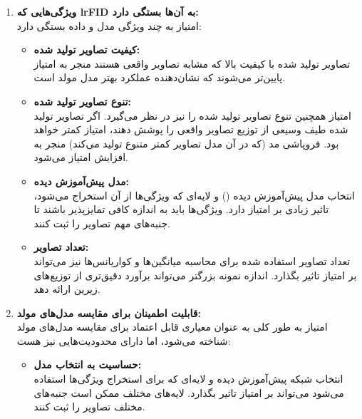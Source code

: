 \begin{enumerate}
\begin{qsolve}
	\begin{enumerate}
		\item \textbf{ویژگی‌هایی که lr{FID} به آن‌ها بستگی دارد: }\\
امتیاز  به چند ویژگی مدل و داده بستگی دارد:

		\begin{itemize}
			\item \textbf{کیفیت تصاویر تولید شده:}\\
تصاویر تولید شده با کیفیت بالا که مشابه تصاویر واقعی هستند منجر به امتیاز  پایین‌تر می‌شوند که نشان‌دهنده عملکرد بهتر مدل مولد است.

		
			\item \textbf{تنوع تصاویر تولید شده:}\\
امتیاز  همچنین تنوع تصاویر تولید شده را نیز در نظر می‌گیرد. اگر تصاویر تولید شده طیف وسیعی از توزیع تصاویر واقعی را پوشش دهند، امتیاز کمتر خواهد بود. فروپاشی مد (که در آن مدل تصاویر کمتر متنوع تولید می‌کند) منجر به افزایش امتیاز  می‌شود.

			\item \textbf{مدل  پیش‌آموزش دیده:}\\
انتخاب مدل پیش‌آموزش دیده () و لایه‌ای که ویژگی‌ها از آن استخراج می‌شود، تاثیر زیادی بر امتیاز  دارد. ویژگی‌ها باید به اندازه کافی تمایزپذیر باشند تا جنبه‌های مهم تصاویر را ثبت کنند.

			\item \textbf{تعداد تصاویر:}\\
تعداد تصاویر استفاده شده برای محاسبه میانگین‌ها و کواریانس‌ها نیز می‌تواند بر امتیاز  تاثیر بگذارد. اندازه نمونه بزرگتر می‌تواند برآورد دقیق‌تری از توزیع‌های زیرین ارائه دهد.
			
		\end{itemize}
		
		
		
		
		\item \textbf{قابلیت اطمینان  برای مقایسه مدل‌های مولد:}\\
امتیاز  به طور کلی به عنوان معیاری قابل اعتماد برای مقایسه مدل‌های مولد شناخته می‌شود، اما دارای محدودیت‌هایی نیز هست:

		\begin{itemize}
			\item \textbf{حساسیت به انتخاب مدل:}\\
انتخاب شبکه پیش‌آموزش دیده و لایه‌ای که برای استخراج ویژگی‌ها استفاده می‌شود می‌تواند بر امتیاز تاثیر بگذارد. لایه‌های مختلف ممکن است جنبه‌های مختلف تصاویر را ثبت کنند.



\end{itemize}
\end{enumerate}
\end{qsolve}
\end{enumerate}

